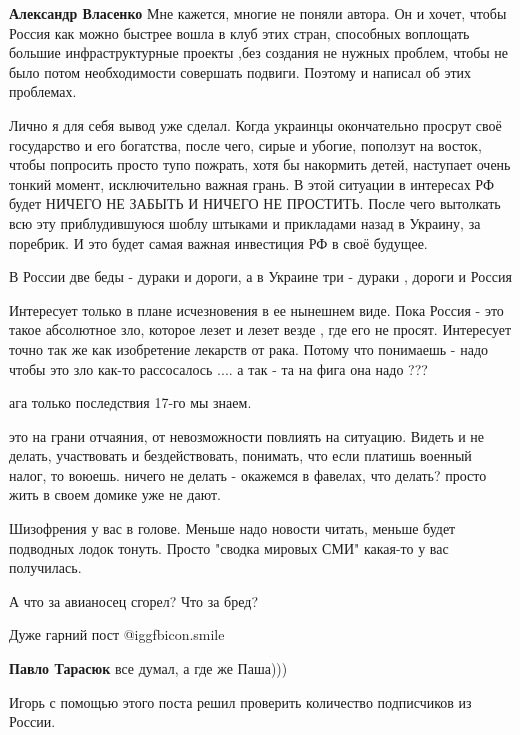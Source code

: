 \begin{itemize}
\begin{itemize} %
\textbf{Александр Власенко} Мне кажется, многие не поняли автора. Он и хочет, чтобы Россия как можно быстрее вошла в клуб этих стран, способных воплощать большие инфраструктурные проекты ,без создания не нужных проблем, чтобы не было потом необходимости совершать подвиги. Поэтому и написал об этих проблемах.
\end{itemize} %


Лично я для себя вывод уже сделал. Когда украинцы окончательно просрут своё
государство и его богатства, после чего, сирые и убогие, поползут на восток,
чтобы попросить просто тупо пожрать, хотя бы накормить детей, наступает очень
тонкий момент, исключительно важная грань. В этой ситуации в интересах РФ будет
НИЧЕГО НЕ ЗАБЫТЬ И НИЧЕГО НЕ ПРОСТИТЬ. После чего вытолкать всю эту
приблудившуюся шоблу штыками и прикладами назад в Украину, за поребрик. И это
будет самая важная инвестиция РФ в своё будущее.


В России две беды - дураки и дороги, а в Украине три - дураки , дороги и Россия


Интересует только в плане исчезновения в ее нынешнем виде. Пока Россия - это
такое абсолютное зло, которое лезет и лезет везде , где его не просят.
Интересует точно так же как изобретение лекарств от рака. Потому что понимаешь
- надо чтобы это зло как-то рассосалось .... а так - та на фига она надо ???

\begin{itemize} %
ага только последствия 17-го мы знаем.


это на грани отчаяния, от невозможности повлиять на ситуацию. Видеть и не
делать, участвовать и бездействовать, понимать, что если платишь военный налог,
то воюешь. ничего не делать - окажемся в фавелах, что делать? просто жить в
своем домике уже не дают.

\end{itemize} %


Шизофрения у вас в голове. Меньше надо новости читать, меньше будет подводных
лодок тонуть. Просто "сводка мировых СМИ" какая-то у вас получилась.


А что за авианосец сгорел? Что за бред?

Дуже гарний пост  @igg{fbicon.smile} 

\textbf{Павло Тарасюк} все думал, а где же Паша)))

Игорь с помощью этого поста решил проверить количество подписчиков из России.


\end{itemize} %

